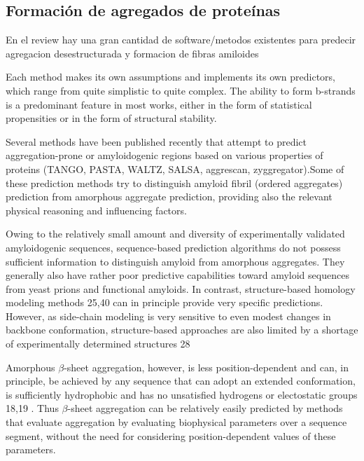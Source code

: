 \subsection{Formación de agregados de proteínas}
En el review \cite{hamodrakas2011protein} hay una gran cantidad de software/metodos existentes para predecir agregacion desestructurada y formacion de fibras amiloides

Each method makes its own assumptions and implements its own predictors, which range from quite simplistic to quite complex. 
The ability to form b-strands is a predominant feature in most works, either in the form of statistical propensities or in the form of structural stability.

% 
% 



Several methods have been published recently that attempt to predict aggregation-prone or amyloidogenic regions based on various properties of proteins (TANGO, PASTA, WALTZ, SALSA, aggrescan, zyggregator).Some of these prediction methods try to distinguish amyloid fibril
(ordered aggregates) prediction from amorphous aggregate prediction, providing also the relevant physical reasoning and influencing factors.

Owing to the relatively small amount
and diversity of experimentally validated amyloidogenic sequences,
sequence-based prediction algorithms do not possess sufficient
information to distinguish amyloid from amorphous aggregates.
They generally also have rather poor predictive capabilities toward
amyloid sequences from yeast prions and functional amyloids. In
contrast, structure-based homology modeling methods 25,40 can in
principle provide very specific predictions. However, as side-chain
modeling is very sensitive to even modest changes in backbone
conformation, structure-based approaches are also limited by a
shortage of experimentally determined structures 28


Amorphous $\beta$-sheet aggregation, however, is less position-dependent and can, in principle, be achieved by any sequence that
can adopt an extended conformation, is sufficiently hydrophobic and has no unsatisfied hydrogens or electostatic groups 18,19 . Thus
$\beta$-sheet aggregation can be relatively easily predicted by methods that evaluate aggregation by evaluating biophysical parameters
over a sequence segment, without the need for considering position-dependent values of these parameters.

